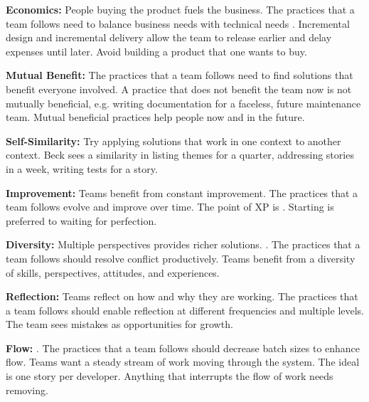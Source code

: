 \textbf{Economics:} People buying the product fuels the business. The practices that a team follows need to balance business needs with technical needs \cite{BeckExtremeProgramming2004}. Incremental design and incremental delivery allow the team to release earlier and delay expenses until later. Avoid building a  product that one wants to buy.


\textbf{Mutual Benefit:} The practices that a team follows need to find solutions that benefit everyone involved. A practice that does not benefit the team now is not mutually beneficial, e.g. writing documentation for a faceless, future maintenance team. Mutual beneficial practices help people now and in the future. 




\textbf{Self-Similarity:} Try applying solutions that work in one context to another context. Beck sees a similarity in listing themes for a quarter, addressing stories in a week, writing tests for a story.


\textbf{Improvement:} Teams benefit from constant improvement. The practices that a team follows evolve and improve over time. The point of XP is  \cite{BeckExtremeProgramming2004}. Starting is preferred to waiting for perfection. 


\textbf{Diversity:} Multiple perspectives provides richer solutions.   \cite{BeckExtremeProgramming2004}. The practices that a team follows should resolve conflict productively. Teams benefit from a diversity of skills, perspectives, attitudes, and experiences.


\textbf{Reflection:} Teams reflect on how and why they are working. The practices that a team follows should enable reflection at different frequencies and multiple levels. The team sees mistakes as opportunities for growth.


\textbf{Flow:}   \cite{BeckExtremeProgramming2004}. The practices that a team follows should decrease batch sizes to enhance flow. Teams want a steady stream of work moving through the system. The ideal  is one story per developer. Anything that interrupts the flow of work needs removing. 


